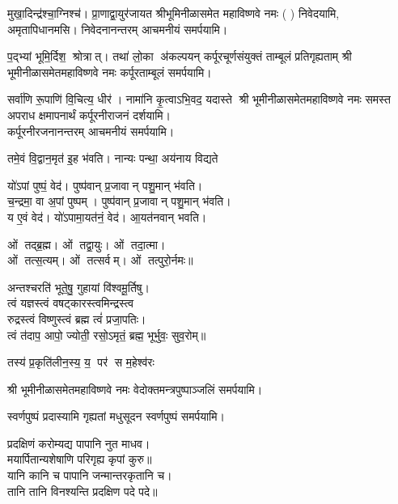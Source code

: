 \begin{center}
 {मुखा॒दिन्द्र॑श्चा॒ग्निश्च॑। प्रा॒णाद्वा॒युर॑जायत}
श्रीभूमिनीळासमेत महाविष्णवे नमः (	) निवेदयामि, \\
अमृतापिधानमसि। निवेदनानन्तरम् आचमनीयं समर्पयामि।\medskip

{प॒द्भ्यां भूमि॒र्दिश॒ श्रोत्रात्। तथा॑ लो॒का अ॑कल्पयन्}
{कर्पूरचूर्णसंयुक्तं ताम्बूलं प्रतिगृह्यताम्}
श्री भूमीनीळासमेतमहाविष्णवे नमः कर्पूरताम्बूलं समर्पयामि।\medskip

{सर्वा॑णि रू॒पाणि॑ वि॒चित्य॒ धीर॑। नामा॑नि कृ॒त्वाऽभि॒वद॒\an{} यदास्ते}
श्री भूमीनीळासमेतमहाविष्णवे नमः समस्त अपराध क्षमापनार्थं कर्पूरनीराजनं दर्शयामि।\\
कर्पूरनीरजनानन्तरम् आचमनीयं समर्पयामि।\medskip

 {तमे॒वं वि॒द्वान॒मृत॑ इ॒ह भ॑वति। नान्यः पन्था॒ अय॑नाय विद्यते}

 यो॑ऽपां पुष्पं॒ वेद॑। पुष्प॑वान् प्र॒जावान् पशु॒मान् भ॑वति।\\
च॒न्द्रमा॒ वा अ॒पां पुष्पम्। पुष्प॑वान् प्र॒जावान् पशु॒मान् भ॑वति।\\
य ए॒वं वेद॑। यो॑ऽपामा॒यत॑नं॒ वेद॑। आ॒यत॑नवान् भवति।\medskip

ओं तद्ब्र॒ह्म। ओं तद्वा॒युः। ओं तदा॒त्मा।\\ ओं तत्स॒त्यम्‌।
ओं तत्सर्वम्‌। ओं तत्पुरो॒र्नमः॥\medskip

अन्तश्चरति॑ भूते॒षु॒ गुहायां वि॑श्वमू॒र्तिषु। \\
त्वं यज्ञस्त्वं वषट्कारस्त्वमिन्द्रस्त्व\\ रुद्रस्त्वं विष्णुस्त्वं ब्रह्म त्वं॑ प्रजा॒पतिः। \\
त्वं त॑दाप॒ आपो॒ ज्योती॒ रसो॒ऽमृतं॒ ब्रह्म॒ भूर्भुवः॒ सुव॒रोम्‌॥\medskip

{तस्य॑ प्र॒कृति॑लीन॒स्य॒ य॒ पर॑ स म॒हेश्व॑रः}
\medskip

श्री भूमीनीळासमेतमहाविष्णवे नमः वेदोक्तमन्त्रपुष्पाञ्जलिं समर्पयामि।\medskip

{स्वर्णपुष्पं प्रदास्यामि गृह्यतां मधुसूदन}
स्वर्णपुष्पं समर्पयामि।\medskip

प्रदक्षिणं करोम्यद्य पापानि नुत माधव।\\
मयार्पितान्यशेषाणि परिगृह्य कृपां कुरु॥\\
 यानि कानि च पापानि जन्मान्तरकृतानि च।\\
तानि तानि विनश्यन्ति प्रदक्षिण पदे पदे॥\medskip


\end{center}
